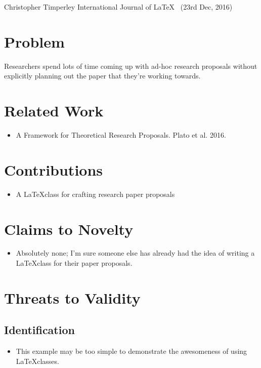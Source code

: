\documentclass{paper_proposal}
\begin{document}
\maketitle

        {Christopher Timperley}
        {International Journal of \LaTeX ~ (23rd Dec, 2016)}

\section{Problem}
Researchers spend lots of time coming up with ad-hoc research proposals
without explicitly planning out the paper that they're working towards.

\section{Related Work}
\begin{itemize}
  \item A Framework for Theoretical Research Proposals. Plato et al. 2016.
\end{itemize}

\section{Contributions}
\begin{itemize}
  \item A \LaTeX class for crafting research paper proposals
\end{itemize}

%
\section{Claims to Novelty}
\begin{itemize}
  \item Absolutely none; I'm sure someone else has already had the idea of
    writing a \LaTeX class for their paper proposals.
\end{itemize}

\section{Threats to Validity}

\subsection{Identification}
\begin{itemize}
  \item This example may be too simple to demonstrate the awesomeness of using
    \LaTeX classes.
\end{itemize}
\end{document}
